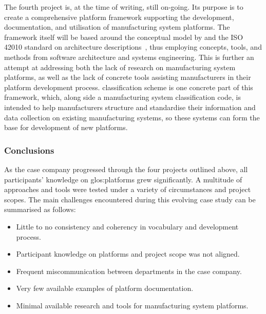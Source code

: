 The fourth project is, at the time of writing, still on-going.
Its purpose is to create a comprehensive platform framework supporting the development, documentation, and utilisation of manufacturing system platforms.
The framework itself will be based around the conceptual model by \textcite{BossenCMod} and the ISO 42010 standard on architecture descriptions~\parencite{ISO42010}, thus employing concepts, tools, and methods from software architecture and systems engineering.
This is further an attempt at addressing both the lack of research on manufacturing system platforms, as well as the lack of concrete tools assisting manufacturers in their platform development process.
 classification scheme is one concrete part of this framework, which, along side a manufacturing system classification code, is intended to help manufacturers structure and standardise their information and data collection on existing manufacturing systems, so these systems can form the base for development of new platforms.

\subsubsection*{Conclusions}
As the case company progressed through the four projects outlined above, all participants' knowledge on \gls{glos:platform}s grew significantly.
A multitude of approaches and tools were tested under a variety of circumstances and project scopes.
The main challenges encountered during this evolving case study can be summarised as follows:
\begin{itemize}
  \item Little to no consistency and coherency in vocabulary and development process.
  \item Participant knowledge on platforms and project scope was not aligned.
  \item Frequent miscommunication between departments in the case company.
  \item Very few available examples of platform documentation.
  \item Minimal available research and tools for manufacturing system platforms.
\end{itemize}

